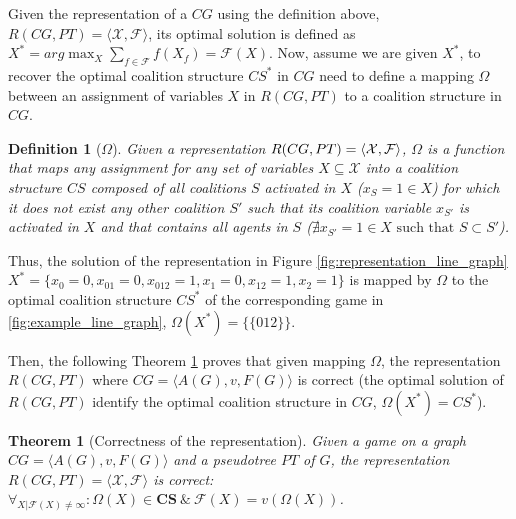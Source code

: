 \documentclass{aamas2012}
\newtheorem{theorem}{Theorem}
\newtheorem{definition}{Definition}
\begin{document}
Given the representation of a $CG$ using the definition above, $R(CG,PT) =
\langle \mathcal{X}, \mathcal{F}\rangle$, its optimal solution is defined as  
$X^*= arg \max_{X} \sum_{f\in\mathcal{F}} f(X_f)= \mathcal{F}(X)$.
Now, assume we are given $X^*$, to recover the optimal coalition structure $CS^*$
in $CG$ need to define a mapping $\Omega$ between an assignment
of variables $X$ in $R(CG,PT)$ to a coalition structure in $CG$.



\begin{definition}[$\Omega$]
Given a representation $R(CG,PT)= \break \langle \mathcal{X},
\mathcal{F}\rangle$, $\Omega$ is a function that maps any assignment for any set
of variables $X\subseteq \mathcal{X}$ into a coalition structure $CS$ composed
of all coalitions $S$ activated in $X$ ($x_S=1\in X$) for which it does not
exist any other coalition $S'$ such that its coalition variable $x_{S'}$ is
activated in $X$ and that contains all agents in $S$ ($\nexists x_{S'}=1 \in X \text{ such that } S \subset S'$).
\end{definition}

Thus, the solution of the representation in Figure
\ref{fig:representation_line_graph}
$X^*=\{x_{0}=0,x_{01}=0,x_{012}=1,x_{1}=0,x_{12}=1,x_{2}=1 \}$ is mapped by
$\Omega$ to the optimal coalition structure $CS^*$ of the corresponding game in
\ref{fig:example_line_graph}, $\Omega(X^*)=\{\{012\}\}$.








Then, the following Theorem \ref{th:correctness_cgm} proves that given mapping
$\Omega$, the representation $R(CG,PT)$ where $CG=\langle A(G), v, F(G)\rangle$ is correct (the optimal
solution of $R(CG,PT)$ identify the optimal coalition structure in $CG$,
$\Omega(X^*)=CS^*$). 


\begin{theorem}[Correctness of the representation]
Given a game on a graph $CG=\langle A(G), v, F(G)\rangle$ and a
pseudotree $PT$ of $G$, the representation $R(CG,PT)=\langle
\mathcal{X}, \mathcal{F} \rangle$ is correct: $\forall_{X\vert
\mathcal{F}(X) \neq \infty }:\Omega(X) \in \mathbf{CS}\ \& \ \mathcal{F}(X) = v(\Omega(X))$.
\label{th:correctness_cgm}
\end{theorem}
\end{document}
